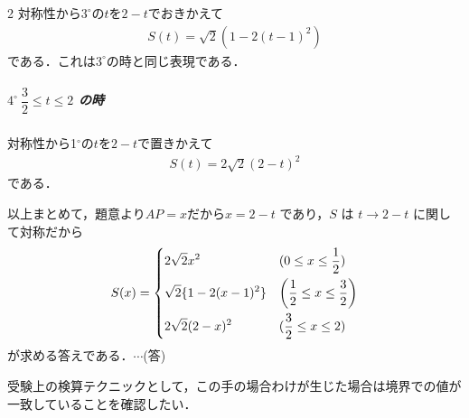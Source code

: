 \documentclass[../../main.tex]{subfiles}
\begin{document}
\begin{multicols}{2}
  対称性から$3^\circ$の$t$を$2-t$でおきかえて
  \begin{align}
    S(t) = \sqrt{2}\left(1-2(t-1)^2\right)
  \end{align}
  である．これは$3^\circ$の時と同じ表現である．

  \subparagraph{$4^\circ \ \dfrac{3}{2} \le t \le 2$ の時}

  対称性から1$^\circ$の$t$を$2-t$で置きかえて
  \begin{align}
    S(t) = 2\sqrt{2}(2-t)^2
  \end{align}
  である．
  \casesend

  以上まとめて，題意より$AP=x$だから$x=2-t$ であり，$S$ は $t \to 2-t$ に関して対称だから
  \begin{align}
    S(x)
    =
    \begin{dcases}
      2\sqrt{2}x^2           & (0 \le x \le \dfrac{1}{2})                      \\
      \sqrt{2}\{1-2(x-1)^2\} & \left(\dfrac{1}{2} \le x \le \dfrac{3}{2}\right) \\
      2\sqrt{2}(2-x)^2       & (\dfrac{3}{2} \le x \le 2)
    \end{dcases}
  \end{align}
  が求める答えである．$\cdots$(答)

  受験上の検算テクニックとして，この手の場合わけが生じた場合は境界での値が一致していることを確認したい．

  \newpage
\end{multicols}
\end{document}
